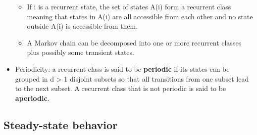 \documentclass[12pt]{report}
\renewcommand{\_}{\kern-1.5pt\textunderscore\kern-1.5pt}
\begin{document}
\begin{itemize}
\begin{itemize}
	\item If i is a recurrent state, the set of states A(i) form a recurrent class meaning that states in A(i) are all accessible from each other and no state outside A(i) is accessible from them. \par

	\item A Markov chain can be decomposed into one or more recurrent classes plus possibly some transient states.\par


\end{itemize}
	\item Periodicity: a recurrent class is said to be \textbf{periodic} if its states can be grouped in d > 1 disjoint subsets so that all transitions from one subset lead to the next subset. A recurrent class that is not periodic is said to be \textbf{aperiodic}.  \par


\end{itemize}\subsection*{Steady-state behavior}
\end{document}
